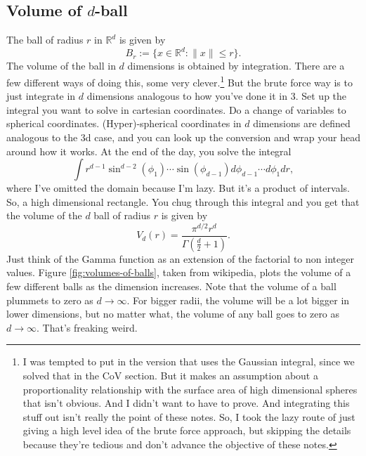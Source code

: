 \documentclass{book}
\newcommand{\R}{\mathbb{R}}
\begin{document}
\subsection{Volume of $d$-ball}
The ball of radius $r$ in $\R^d$ is given by
$$
B_r := \{ x\in \R^d: \|x\| \leq r\}.
$$
The volume of the ball in $d$ dimensions is obtained by integration. There are a few different ways of doing this, some very clever.\footnote{I was tempted to put in the version that uses the Gaussian integral, since we solved that in the CoV section. But it makes an assumption about a proportionality relationship with the surface area of high dimensional spheres that isn't obvious. And I didn't want to have to prove. And integrating this stuff out isn't really the point of these notes. So, I took the lazy route of just giving a high level idea of the brute force approach, but skipping the details because they're tedious and don't advance the objective of these notes.} But the brute force way is to just integrate in $d$ dimensions analogous to how you've done it in 3. Set up the integral you want to solve in cartesian coordinates. Do a change of variables to spherical coordinates. (Hyper)-spherical coordinates in $d$ dimensions are defined analogous to the 3d case, and you can look up the conversion and wrap your head around how it works. At the end of the day, you solve the integral
$$
\int r^{d-1} \sin^{d-2}(\phi_1)\cdots\sin(\phi_{d-1}) d\phi_{d-1}\cdots d\phi_{1} dr,
$$
where I've omitted the domain because I'm lazy. But it's a product of intervals. So, a high dimensional rectangle. You chug through this integral and you get that the volume of the $d$ ball of radius $r$ is given by
$$
V_d(r) = \frac{\pi^{d/2}r^d}{\Gamma(\frac{d}{2} + 1)}. 
$$
Just think of the Gamma function as an extension of the factorial to non integer values. Figure \ref{fig:volumes-of-balls}, taken from wikipedia, plots the volume of a few different balls as the dimension increases. Note that the volume of a ball plummets to zero as $d\to\infty$. For bigger radii, the volume will be a lot bigger in lower dimensions, but no matter what, the volume of any ball goes to zero as $d\to \infty$. That's freaking weird. \
\end{document}
